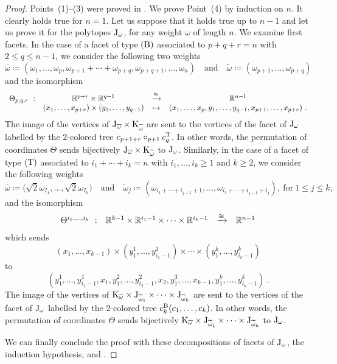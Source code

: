 \documentclass[twoside, 12pt]{amsart}
\theoremstyle{remark}
\begin{document}
\begin{proof}

Points~(1)--(3) were proved in \cite{Forcey08}.  
We prove Point~(4) by induction on $n$. 
It clearly holds true for $n=1$. Let us suppose that it holds true up to $n-1$ and let us prove it for the polytopes $\mathrm{J}_\omega$, for any weight $\omega$ of length $n$.
We examine first facets. 
In the case of a facet of type $(\mathrm{B})$ associated to $p+q+r=n$ with $2\leq q \leq n-1$, we consider the following two weights 
\[
\overline{\omega}\coloneqq (\omega_1, \ldots, \omega_{p}, \omega_{p+1}+\cdots+\omega_{p+q}, \omega_{p+q+1}, \ldots,  \omega_{n})
\quad \text{and} \quad 
\widetilde{\omega}\coloneqq (\omega_{p+1}, \ldots, \omega_{p+q})
\]
and the isomorphism 
\begin{align*}
\begin{array}{rccc}
\Theta_{p,q,r}\  : &  \mathbb{R}^{p+r}\times \mathbb{R}^{q-1} &\xrightarrow{\cong} &\mathbb{R}^{n-1}\\
&(x_1, \ldots, x_{p+r})\times (y_1, \ldots, y_{q-1}) & \mapsto& 
(x_1, \ldots, x_{p} , y_1, \ldots, y_{q-1}, x_{p+1}, \ldots, x_{p+r})\ .
\end{array}
\end{align*}
The image of the vertices of $\mathrm{J}_{\overline{\omega}}\times \mathrm{K}_{\widetilde{\omega}}$ are sent to the vertices of the facet of $\mathrm{J}_\omega$
labelled by the 2-colored tree $c_{p+1+r}\circ_{p+1} c^{\mathrm{T}}_q$. 
In other words, the permutation of coordinates $\Theta$ sends bijectively $\mathrm{J}_{\overline{\omega}}\times \mathrm{K}_{\widetilde{\omega}}$ to $\mathrm{J}_\omega$. 
Similarly, in the case of a facet of type $(\mathrm{T})$ associated to $i_1+\cdots+i_k=n$ with 
$i_1, \ldots,i_k\geq 1$ and $k\geq 2$, 
 we consider the following weights 
%
\[
\overline{\omega}\coloneqq \big(\sqrt{2}\omega_{I_1}, \ldots, \sqrt{2}\omega_{I_k}\big)
\quad \text{and} \quad 
\widetilde{\omega}_j\coloneqq (\omega_{i_1+\cdots+i_{j-1}+1}, \ldots, \omega_{i_1+\cdots+i_{j-1}+i_j}), \ \text{for}\ 1\leq j\leq k, 
\]
and the isomorphism 
\begin{align*}
\begin{array}{rccc}
\Theta^{i_1, \ldots, i_k}\  : &  \mathbb{R}^{k-1}\times \mathbb{R}^{i_1-1}\times \cdots \times \mathbb{R}^{i_k-1} &\xrightarrow{\cong} &\mathbb{R}^{n-1}
\end{array}
\end{align*}
which sends 
\[(x_1, \ldots, x_{k-1})\times (y_1^1, \ldots, y^1_{i_1-1})\times \cdots 
\times (y_1^k, \ldots, y^k_{i_k-1})\]
to 
\[(
y^1_1,\ldots, y^1_{i_1-1}, x_1, y^2_1, \ldots, y^2_{i_2-1}, x_2, y^3_1, \ldots, x_{k-1}, y^k_1, \ldots, y^k_{i_k-1}
)\ .\]
The image of the vertices of 
$\mathrm{K}_{\overline{\omega}}\times \mathrm{J}_{\widetilde{\omega}_1}\times \cdots \times \mathrm{J}_{\widetilde{\omega}_k}$ are sent to the vertices of the facet of $\mathrm{J}_\omega$
labelled by the 2-colored tree $c^{\mathrm{B}}_k(c_1, \ldots, c_k)$. In other words, the permutation of coordinates $\Theta$ sends bijectively $\mathrm{K}_{\overline{\omega}}\times \mathrm{J}_{\widetilde{\omega}_1}\times \cdots \times \mathrm{J}_{\widetilde{\omega}_k}$ to $\mathrm{J}_\omega$. 

We can finally conclude the proof with these decompositions of facets of $\mathrm{J}_\omega$, the induction hypothesis, and \cite[Proposition~1, Point~(5)]{MTTV19}.
\end{proof}
\end{document}
